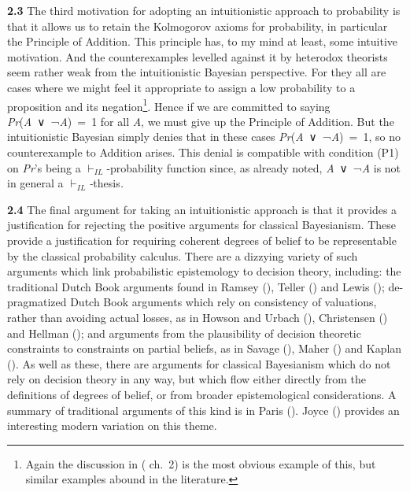 \documentclass[
  10pt,
  letterpaper,
  DIV=11,
  numbers=noendperiod,
  twoside]{scrartcl}
\begin{document}
\textbf{2.3} The third motivation for adopting an intuitionistic
approach to probability is that it allows us to retain the Kolmogorov
axioms for probability, in particular the Principle of Addition. This
principle has, to my mind at least, some intuitive motivation. And the
counterexamples levelled against it by heterodox theorists seem rather
weak from the intuitionistic Bayesian perspective. For they all are
cases where we might feel it appropriate to assign a low probability to
a proposition and its negation\footnote{Again the discussion in
  ( ch.~2) is the most obvious
  example of this, but similar examples abound in the literature.}.
Hence if we are committed to saying \emph{Pr}(\emph{A}~∨~¬\emph{A})~=~1
for all \emph{A}, we must give up the Principle of Addition. But the
intuitionistic Bayesian simply denies that in these cases
\emph{Pr}(\emph{A}~∨~¬\emph{A})~=~1, so no counterexample to Addition
arises. This denial is compatible with condition (P1) on \emph{Pr}'s
being a \(\vdash_{IL}\)-probability function since, as already noted,
\emph{A}~∨~¬\emph{A} is not in general a
\(\vdash_{IL}\)\emph{-}thesis\emph{.}

\textbf{2.4} The final argument for taking an intuitionistic approach is
that it provides a justification for rejecting the positive arguments
for classical Bayesianism. These provide a justification for requiring
coherent degrees of belief to be representable by the classical
probability calculus. There are a dizzying variety of such arguments
which link probabilistic epistemology to decision theory, including: the
traditional Dutch Book arguments found in Ramsey
(), Teller
() and Lewis
(); de-pragmatized Dutch Book arguments
which rely on consistency of valuations, rather than avoiding actual
losses, as in Howson and Urbach (),
Christensen () and Hellman
(); and arguments from the plausibility
of decision theoretic constraints to constraints on partial beliefs, as
in Savage (), Maher
() and Kaplan
(). As well as these, there are arguments
for classical Bayesianism which do not rely on decision theory in any
way, but which flow either directly from the definitions of degrees of
belief, or from broader epistemological considerations. A summary of
traditional arguments of this kind is in Paris
(). Joyce ()
provides an interesting modern variation on this theme.
\end{document}
